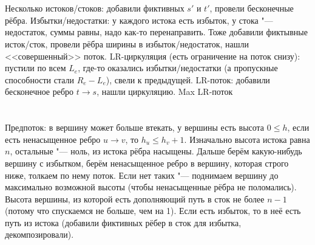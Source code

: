 \section{} %
Несколько истоков/стоков: добавили фиктивных $s'$ и $t'$, провели бесконечные рёбра.
Избытки/недостатки: у каждого истока есть избыток, у стока "--- недостаток, суммы равны, надо как-то перенаправить.
Тоже добавили фиктывные исток/сток, провели рёбра ширины в избыток/недостаток, нашли <<совершенный>> поток.
LR-циркуляция (есть ограничение на поток снизу): пустили по всем $L_e$, где-то оказались избытки/недостатки (а пропускные способности стали $R_e-L_e$), свели к предыдущей.
LR-поток: добавили бесконечное ребро $t \to s$, нашли циркуляцию.
\TODO Max LR-поток

\section{} %
Предпоток: в вершину может больше втекать, у вершины есть высота $0 \le h$, если есть ненасыщенное ребро $u \to v$, то $h_u \le h_v + 1$.
Изначально высота истока равна $n$, остальные "--- ноль, из истока рёбра насыщены.
Дальше берём какую-нибудь вершину с избытком, берём ненасыщенное ребро в вершину, которая строго ниже, толкаем по нему поток.
Если нет таких "--- поднимаем вершину до максимально возможной высоты (чтобы ненасыщенные рёбра не поломались).
Высота вершины, из которой есть дополняющий путь в сток не более $n-1$ (потому что спускаемся не больше, чем на 1).
Если есть избыток, то в неё есть путь из истока (добавили фиктивных рёбер в сток для избытка, декомпозировали).
\TODO

\section{} %

\section{} %

\section{} %

\section{} %

\section{} %

\section{} %
